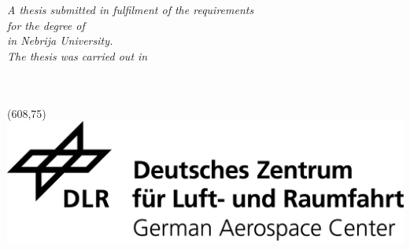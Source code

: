 \documentclass[
11pt, %
english, %
singlespacing, %
headsepline, %
]{MastersDoctoralThesis} %
\begin{document}
\begin{titlepage}
\begin{center}
\vfill

\large \textit{A thesis submitted in fulfilment of the requirements \\ for the degree of \degreename \\ in Nebrija University.}\\[0.3cm] %
\textit{The thesis was carried out in}\\[0.4cm]
\groupname\\\deptname\\[1cm] %
\vfill
\centerline{{\colorbox{white}{\makebox(608,75){\includegraphics[scale=0.65]{logos/DLR_Logo_EN_schwarz.png}}}}}

\vfill
\end{center}
\end{titlepage}
\pagecolor{white}
\end{document}
